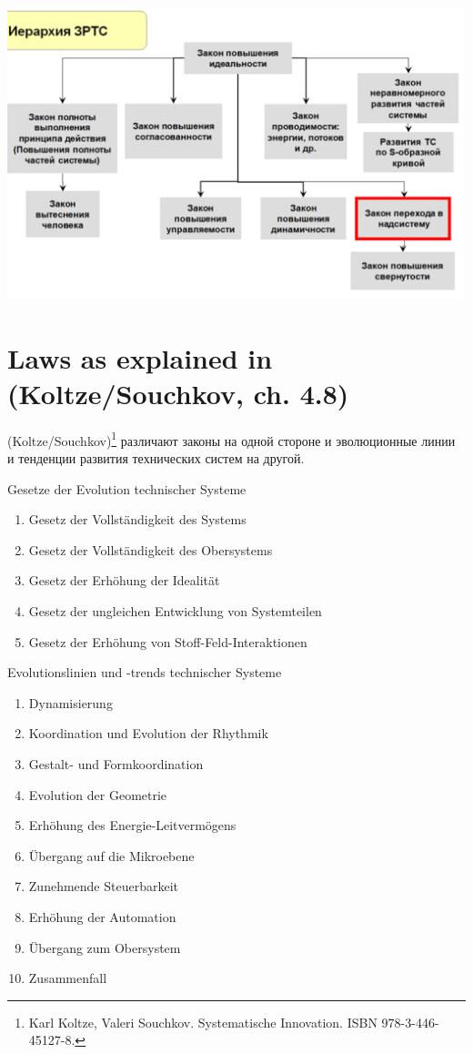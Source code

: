 \documentclass[11pt,a4paper]{article}
\begin{document}
\begin{center}
  \includegraphics[width=.9\textwidth]{oE4yUs.png}
\end{center}

\section*{Laws as explained in (Koltze/Souchkov, ch. 4.8)}

(Koltze/Souchkov)\footnote{ Karl Koltze, Valeri Souchkov. Systematische
  Innovation. ISBN 978-3-446-45127-8.} различают законы на одной стороне и
эволюционные линии и тенденции развития технических систем на другой.

Gesetze der Evolution technischer Systeme
\begin{enumerate}\itemsep0pt
\item Gesetz der Vollständigkeit des Systems
\item Gesetz der Vollständigkeit des Obersystems
\item Gesetz der Erhöhung der Idealität
\item Gesetz der ungleichen Entwicklung von Systemteilen
\item Gesetz der Erhöhung von Stoff-Feld-Interaktionen
\end{enumerate}

Evolutionslinien und -trends technischer Systeme
\begin{enumerate}\itemsep0pt
\item Dynamisierung
\item Koordination und Evolution der Rhythmik
\item Gestalt- und Formkoordination
\item Evolution der Geometrie
\item Erhöhung des Energie-Leitvermögens
\item Übergang auf die Mikroebene
\item Zunehmende Steuerbarkeit
\item Erhöhung der Automation
\item Übergang zum Obersystem
\item Zusammenfall
\end{enumerate}
\end{document}
